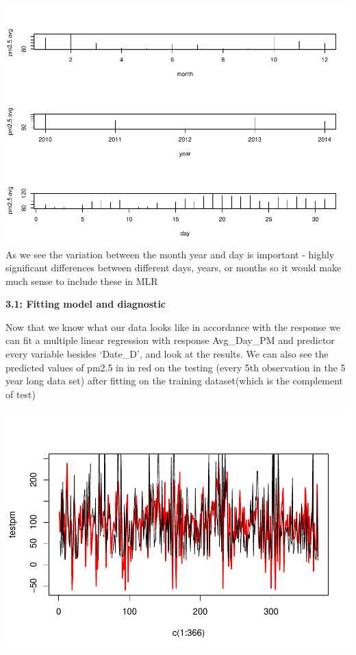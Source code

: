\documentclass[
]{article}
\begin{document}
\includegraphics{Final_Project_2_files/figure-latex/unnamed-chunk-6-1.pdf}
As we see the variation between the month year and day is important -
highly significant differences between different days, years, or months
so it would make much sense to include these in MLR

\textbf{3.1: Fitting model and diagnostic}

Now that we know what our data looks like in accordance with the
response we can fit a multiple linear regression with response
Avg\_Day\_PM and predictor every variable besides `Date\_D', and look at
the results. We can also see the predicted values of pm2.5 in in red on
the testing (every 5th observation in the 5 year long data set) after
fitting on the training dataset(which is the complement of test)

\includegraphics{Final_Project_2_files/figure-latex/unnamed-chunk-7-1.pdf}
\end{document}
